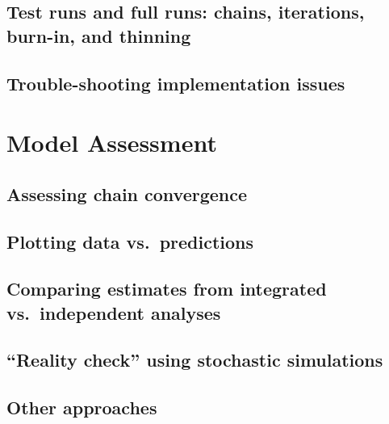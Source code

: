 \documentclass[
]{book}
\begin{document}
\hypertarget{test-runs-and-full-runs-chains-iterations-burn-in-and-thinning}{%
\section{Test runs and full runs: chains, iterations, burn-in, and thinning}\label{test-runs-and-full-runs-chains-iterations-burn-in-and-thinning}}

\hypertarget{trouble-shooting-implementation-issues}{%
\section{Trouble-shooting implementation issues}\label{trouble-shooting-implementation-issues}}

\hypertarget{ModelAssm}{%
\chapter{Model Assessment}\label{ModelAssm}}

\hypertarget{assessing-chain-convergence}{%
\section{Assessing chain convergence}\label{assessing-chain-convergence}}

\hypertarget{plotting-data-vs.-predictions}{%
\section{Plotting data vs.~predictions}\label{plotting-data-vs.-predictions}}

\hypertarget{comparing-estimates-from-integrated-vs.-independent-analyses}{%
\section{Comparing estimates from integrated vs.~independent analyses}\label{comparing-estimates-from-integrated-vs.-independent-analyses}}

\hypertarget{reality-check-using-stochastic-simulations}{%
\section{``Reality check'' using stochastic simulations}\label{reality-check-using-stochastic-simulations}}

\hypertarget{other-approaches}{%
\section{Other approaches}\label{other-approaches}}
\end{document}
